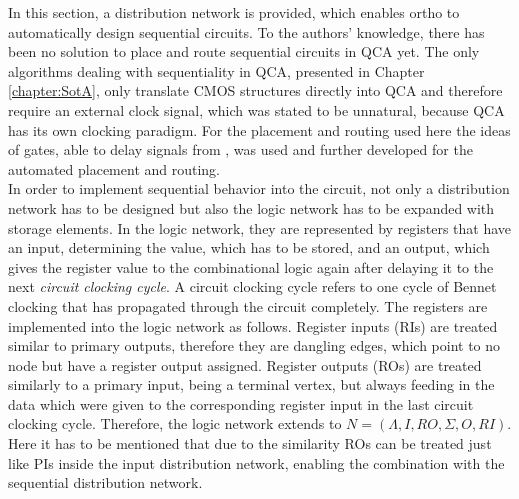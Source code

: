 In this section, a distribution network is provided, which enables ortho to automatically design sequential circuits. To the authors' knowledge, there has been no solution to place and route sequential circuits in QCA yet. The only algorithms dealing with sequentiality in QCA, presented in Chapter \ref{chapter:SotA}, only translate CMOS structures directly into QCA and therefore require an external clock signal, which was stated to be unnatural, because QCA has its own clocking paradigm. For the placement and routing used here the ideas of gates, able to delay signals from \cite{Walter}, was used and further developed for the automated placement and routing.\\
In order to implement sequential behavior into the circuit, not only a distribution network has to be designed but also the logic network has to be expanded with storage elements. In the logic network, they are represented by registers that have an input, determining the value, which has to be stored, and an output, which gives the register value to the combinational logic again after delaying it to the next \textit{circuit clocking cycle}. A circuit clocking cycle refers to one cycle of Bennet clocking that has propagated through the circuit completely. The registers are implemented into the logic network as follows. Register inputs (RIs) are treated similar to primary outputs, therefore they are dangling edges, which point to no node but have a register output assigned. Register outputs (ROs) are treated similarly to a primary input, being a terminal vertex, but always feeding in the data which were given to the corresponding register input in the last circuit clocking cycle. Therefore, the logic network extends to $N = (\Lambda, I, RO, \Sigma, O, RI)$. Here it has to be mentioned that due to the similarity ROs can be treated just like PIs inside the input distribution network, enabling the combination with the sequential distribution network.
